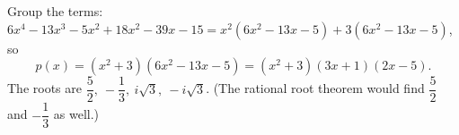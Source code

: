 Group the terms: $6x^4-13x^3-5x^2+18x^2-39x-15=x^2(6x^2-13x-5)+3(6x^2-13x-5)$, so
\[p(x)=(x^2+3)(6x^2-13x-5)=(x^2+3)(3x+1)(2x-5).\]
The roots are $\boxed{\dfrac52,\ -\dfrac13,\ i\sqrt3,\ -i\sqrt3}$. (The rational root theorem would find $\dfrac52$ and $-\dfrac13$ as well.)
